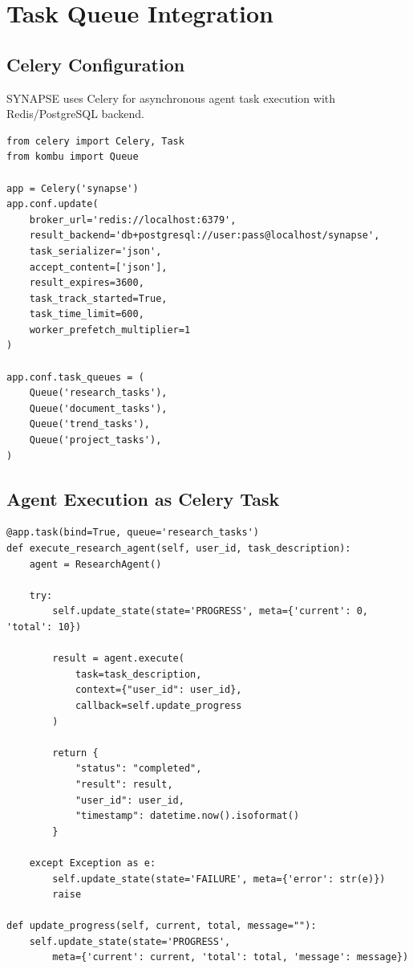 \documentclass{report}
\begin{document}
\chapter{Task Queue Integration}

\section{Celery Configuration}

SYNAPSE uses Celery for asynchronous agent task execution with Redis/PostgreSQL backend.

\begin{lstlisting}
from celery import Celery, Task
from kombu import Queue

app = Celery('synapse')
app.conf.update(
    broker_url='redis://localhost:6379',
    result_backend='db+postgresql://user:pass@localhost/synapse',
    task_serializer='json',
    accept_content=['json'],
    result_expires=3600,
    task_track_started=True,
    task_time_limit=600,
    worker_prefetch_multiplier=1
)

app.conf.task_queues = (
    Queue('research_tasks'),
    Queue('document_tasks'),
    Queue('trend_tasks'),
    Queue('project_tasks'),
)
\end{lstlisting}

\section{Agent Execution as Celery Task}

\begin{lstlisting}
@app.task(bind=True, queue='research_tasks')
def execute_research_agent(self, user_id, task_description):
    agent = ResearchAgent()
    
    try:
        self.update_state(state='PROGRESS', meta={'current': 0, 'total': 10})
        
        result = agent.execute(
            task=task_description,
            context={"user_id": user_id},
            callback=self.update_progress
        )
        
        return {
            "status": "completed",
            "result": result,
            "user_id": user_id,
            "timestamp": datetime.now().isoformat()
        }
    
    except Exception as e:
        self.update_state(state='FAILURE', meta={'error': str(e)})
        raise

def update_progress(self, current, total, message=""):
    self.update_state(state='PROGRESS', 
        meta={'current': current, 'total': total, 'message': message})
\end{lstlisting}
\end{document}
